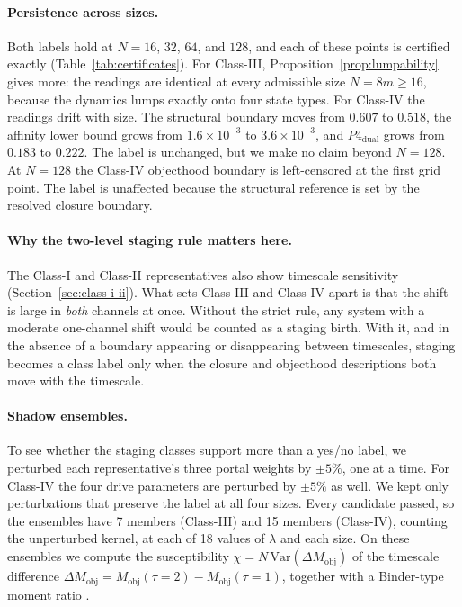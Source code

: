 \paragraph{Persistence across sizes.} Both labels hold at $N=16$, $32$, $64$, and $128$, and each of these points is certified exactly (Table~\ref{tab:certificates}). For Class-III, Proposition~\ref{prop:lumpability} gives more: the readings are identical at every admissible size $N=8m\ge16$, because the dynamics lumps exactly onto four state types. For Class-IV the readings drift with size. The structural boundary moves from $0.607$ to $0.518$, the affinity lower bound grows from $1.6\times10^{-3}$ to $3.6\times10^{-3}$, and $P4_{\mathrm{dual}}$ grows from $0.183$ to $0.222$. The label is unchanged, but we make no claim beyond $N=128$. At $N=128$ the Class-IV objecthood boundary is left-censored at the first grid point. The label is unaffected because the structural reference is set by the resolved closure boundary.

\paragraph{Why the two-level staging rule matters here.} The Class-I and Class-II representatives also show timescale sensitivity (Section~\ref{sec:class-i-ii}). What sets Class-III and Class-IV apart is that the shift is large in \emph{both} channels at once. Without the strict rule, any system with a moderate one-channel shift would be counted as a staging birth. With it, and in the absence of a boundary appearing or disappearing between timescales, staging becomes a class label only when the closure and objecthood descriptions both move with the timescale.

\paragraph{Shadow ensembles.} To see whether the staging classes support more than a yes/no label, we perturbed each representative's three portal weights by $\pm5\%$, one at a time. For Class-IV the four drive parameters are perturbed by $\pm5\%$ as well. We kept only perturbations that preserve the label at all four sizes. Every candidate passed, so the ensembles have 7 members (Class-III) and 15 members (Class-IV), counting the unperturbed kernel, at each of 18 values of $\lambda$ and each size. On these ensembles we compute the susceptibility $\chi=N\,\mathrm{Var}(\Delta M_{\mathrm{obj}})$ of the timescale difference $\Delta M_{\mathrm{obj}}=M_{\mathrm{obj}}(\tau{=}2)-M_{\mathrm{obj}}(\tau{=}1)$, together with a Binder-type moment ratio \cite{fisher_barber_1972,binder_1981_prl}.

